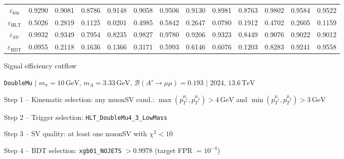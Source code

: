 \documentclass[10pt,a4paper]{article}
\begin{document}
\begin{landscape}
{\begin{tabular}{c|cccc|cccc|cccc}
\midrule
$\varepsilon_{\mathrm{kin}}$ & 0.9290 & 0.9081 & 0.8786 & 0.9148 & 0.9058 & 0.9506 & 0.9130 & 0.8981 & 0.8763 & 0.9802 & 0.9584 & 0.9522\\
$\varepsilon_{\mathrm{HLT}}$ & 0.5026 & 0.2819 & 0.1125 & 0.0201 & 0.4985 & 0.5842 & 0.2647 & 0.0780 & 0.1912 & 0.4702 & 0.2605 & 0.1159\\
$\varepsilon_{\mathrm{SV}}$ & 0.9932 & 0.9349 & 0.7954 & 0.8235 & 0.9827 & 0.9780 & 0.9206 & 0.9323 & 0.8449 & 0.9076 & 0.9022 & 0.9012\\
$\varepsilon_{\mathrm{BDT}}$ & 0.0955 & 0.2118 & 0.1636 & 0.1366 & 0.3171 & 0.5993 & 0.6146 & 0.6076 & 0.1203 & 0.8283 & 0.9241 & 0.9558\\
\bottomrule
\end{tabular}}

\end{landscape}
\clearpage

{\large Signal efficiency cutflow

 \texttt{DoubleMu} $|$ $m_{\pi}=10\,\mathrm{GeV}$, $m_{A}=3.33\,\mathrm{GeV}$, $\mathcal{B}(A'\!\to\!\mu\mu)=0.193$ $|$ 2024, $13.6\,\mathrm{TeV}$}

\vspace{0.8em}

Step 1 -- Kinematic selection: any muonSV cand.: $\max(p_T^{\mu_1},p_T^{\mu_2}){>}4\,\mathrm{GeV}$ and $\min(p_T^{\mu_1},p_T^{\mu_2}){>}3\,\mathrm{GeV}$

Step 2 -- Trigger selection: \texttt{HLT\_DoubleMu4\_3\_LowMass}

Step 3 -- SV quality: at least one muonSV with $\chi^2<10$

Step 4 -- BDT selection: \texttt{xgb01\_NOJETS} $>0.9978$ (target FPR $=10^{-4}$)

\vspace{0.8em}
\end{document}
